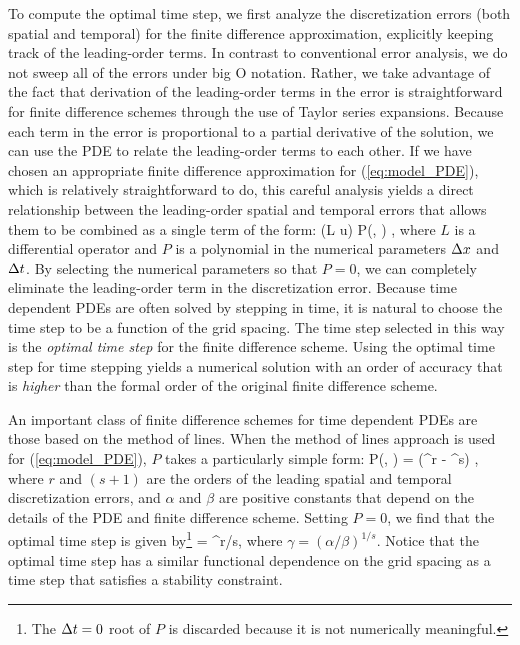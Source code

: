\documentclass[fleqn,12pt,twoside]{article}
\begin{document}
To compute the optimal time step, we first analyze the discretization errors 
(both spatial and temporal) for the finite difference approximation, 
explicitly keeping track of the leading-order terms.  In contrast to 
conventional error analysis, we do not sweep all of the errors under big O
notation.  Rather, we take advantage of the fact that derivation of the 
leading-order terms in the error is straightforward for finite difference
schemes through the use of Taylor series expansions.  Because each term in 
the error is proportional to a partial derivative of the solution, we can 
use the PDE to relate the leading-order terms to each other.  
If we have chosen an appropriate finite difference approximation for 
(\ref{eq:model_PDE}), which is relatively straightforward to do, this careful 
analysis yields a direct relationship between the leading-order spatial and 
temporal errors that allows them to be combined as a single term of the form:
\beq
  (L u) P(\dx, \dt) ,
  \label{eq:leading_order_error_model_PDE_general}
\eeq
where $L$ is a differential operator and $P$ is a polynomial in the numerical 
parameters $\Delta x$ and $\Delta t$.  By selecting the numerical parameters so that 
$P = 0$, we can completely eliminate the leading-order term in the 
discretization error.  Because time dependent PDEs are often solved by 
stepping in time, it is natural to choose the time step to be a function of 
the grid spacing.  The time step selected in this way is the
\emph{optimal time step} for the finite difference scheme.  Using the optimal
time step for time stepping yields a numerical solution with an order 
of accuracy that is \emph{higher} than the formal order of the original finite 
difference scheme.

An important class of finite difference schemes for time dependent PDEs are 
those based on the method of lines.   When the method of lines approach is 
used for (\ref{eq:model_PDE}), $P$ takes a particularly simple 
form:
\beq
  P(\dx, \dt) = (\alpha \dx^r - \beta \dt^s) \dt,
  \label{eq:leading_order_error_model_PDE_MOL}
\eeq
where $r$ and $(s+1)$ are the orders of the leading spatial and temporal 
discretization errors, and $\alpha$ and $\beta$ are positive constants that 
depend on the details of the PDE and finite difference scheme.  Setting 
$P = 0$, we find that the optimal time step is given by\footnote{The $\Delta t = 0$ 
root of $P$ is discarded because it is not numerically meaningful.}
\beq
  \dto = \gamma \dx^{r/s},
  \label{eq:optimal_time_step}
\eeq
where $\gamma = (\alpha/\beta)^{1/s}$.  Notice that the optimal time step 
has a similar functional dependence on the grid spacing as a time step that 
satisfies a stability constraint.  
\end{document}
